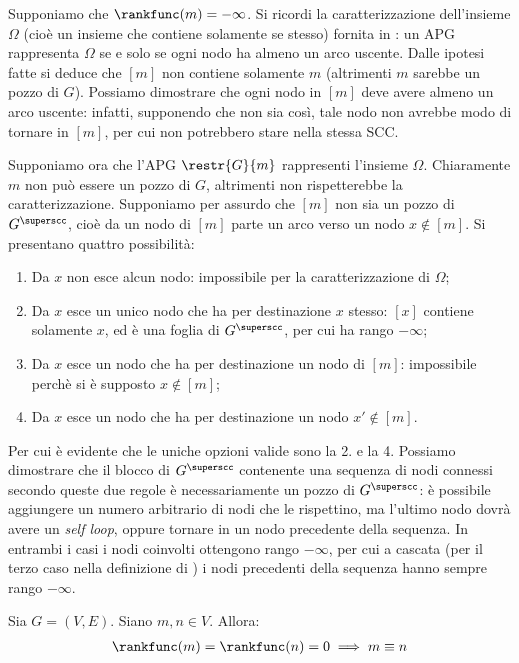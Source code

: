 \begin{proof2}
    Supponiamo che $\rankfunc(m) = - \infty$. Si ricordi la caratterizzazione dell'insieme $\Omega$ (cioè un insieme che contiene solamente se stesso) fornita in \cite{aczel}: un APG rappresenta $\Omega$ se e solo se ogni nodo ha almeno un arco uscente. Dalle ipotesi fatte si deduce che $[m]$ non contiene solamente $m$ (altrimenti $m$ sarebbe un pozzo di $G$). Possiamo dimostrare che ogni nodo in $[m]$ deve avere almeno un arco uscente: infatti, supponendo che non sia così, tale nodo non avrebbe modo di tornare in $[m]$, per cui non potrebbero stare nella stessa SCC.

    Supponiamo ora che l'APG $\restr{G}{m}$ rappresenti l'insieme $\Omega$. Chiaramente $m$ non può essere un pozzo di $G$, altrimenti non rispetterebbe la caratterizzazione. Supponiamo per assurdo che $[m]$ non sia un pozzo di $G^{\superscc}$, cioè da un nodo di $[m]$ parte un arco verso un nodo $x \not\in [m]$. Si presentano quattro possibilità:
    \begin{enumerate}
        \item Da $x$ non esce alcun nodo: impossibile per la caratterizzazione di $\Omega$;
        \item Da $x$ esce un unico nodo che ha per destinazione $x$ stesso: $[x]$ contiene solamente $x$, ed è una foglia di $G^{\superscc}$, per cui ha rango $-\infty$;
        \item Da $x$ esce un nodo che ha per destinazione un nodo di $[m]$: impossibile perchè si è supposto $x \not\in [m]$;
        \item Da $x$ esce un nodo che ha per destinazione un nodo $x' \not\in [m]$.
    \end{enumerate}
    Per cui è evidente che le uniche opzioni valide sono la 2. \hspace{-0.4cm} e la 4. Possiamo dimostrare che il blocco di $G^{\superscc}$ contenente una sequenza di nodi connessi secondo queste due regole è necessariamente un pozzo di $G^{\superscc}$: è possibile aggiungere un numero arbitrario di nodi che le rispettino, ma l'ultimo nodo dovrà avere un \emph{self loop}, oppure tornare in un nodo precedente della sequenza. In entrambi i casi i nodi coinvolti ottengono rango $-\infty$, per cui a cascata (per il terzo caso nella definizione di \rankfunc) i nodi precedenti della sequenza hanno sempre rango $-\infty$.
\end{proof2}
\begin{observation}
    Sia $G = (V,E)$. Siano $m,n \in V$. Allora:
    \begin{gather*}
        \rankfunc(m) = \rankfunc(n) = 0 \implies m \equiv n
    \end{gather*}
\end{observation}
